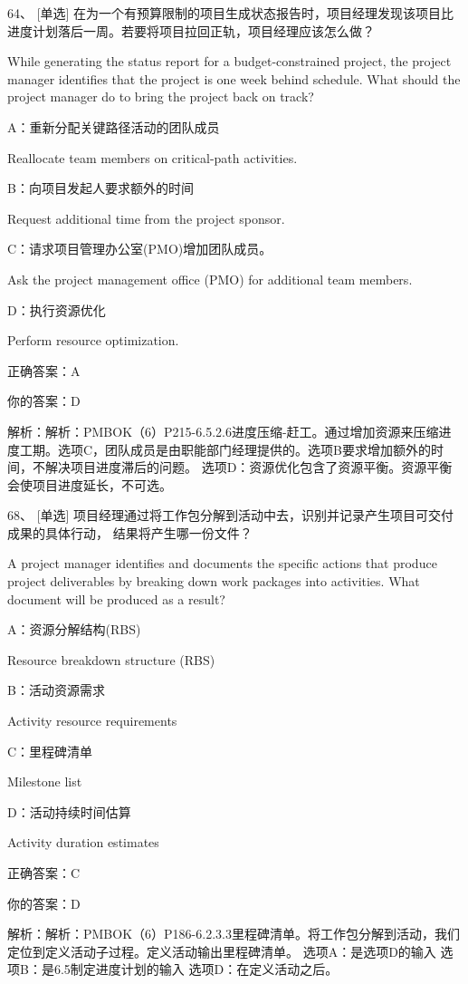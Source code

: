 64、 [单选] 在为一个有预算限制的项目生成状态报告时，项目经理发现该项目比进度计划落后一周。若要将项目拉回正轨，项目经理应该怎么做？

While generating the status report for a budget-constrained project, the project manager identifies that the project is one week behind schedule. What should the project manager do to bring the project back on track?

A：重新分配关键路径活动的团队成员

Reallocate team members on critical-path activities.

B：向项目发起人要求额外的时间

Request additional time from the project sponsor.

C：请求项目管理办公室(PMO)增加团队成员。

Ask the project management office (PMO) for additional team members.

D：执行资源优化

Perform resource optimization.

正确答案：A

你的答案：D

解析：解析：PMBOK（6）P215-6.5.2.6进度压缩-赶工。通过增加资源来压缩进度工期。选项C，团队成员是由职能部门经理提供的。选项B要求增加额外的时间，不解决项目进度滞后的问题。 选项D：资源优化包含了资源平衡。资源平衡会使项目进度延长，不可选。


68、 [单选] 项目经理通过将工作包分解到活动中去，识别并记录产生项目可交付成果的具体行动， 结果将产生哪一份文件？

A project manager identifies and documents the specific actions that produce project deliverables by breaking down work packages into activities. What document will be produced as a result?

A：资源分解结构(RBS)

Resource breakdown structure (RBS)

B：活动资源需求

Activity resource requirements

C：里程碑清单

Milestone list

D：活动持续时间估算

Activity duration estimates

正确答案：C

你的答案：D

解析：解析：PMBOK（6）P186-6.2.3.3里程碑清单。将工作包分解到活动，我们定位到定义活动子过程。定义活动输出里程碑清单。 选项A：是选项D的输入 选项B：是6.5制定进度计划的输入 选项D：在定义活动之后。


